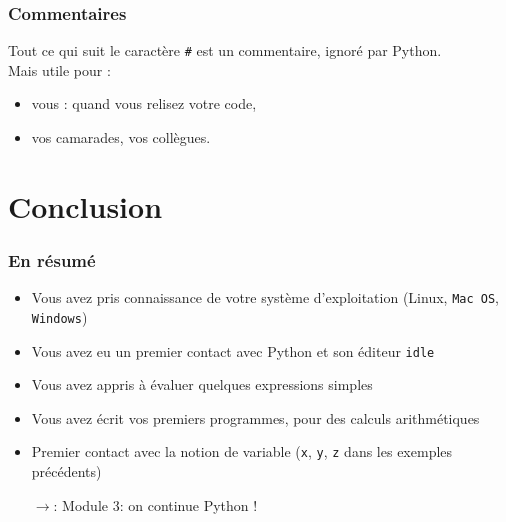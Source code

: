 \documentclass{beamer}
\newcommand{\mypause}{\pause}
\newcommand{\pyth}{{\sc Python}}
\newcommand{\prog}[1]{\alert{\texttt{#1}}}
\begin{document}
\frame
{
\frametitle{Commentaires}
{
Tout ce qui suit le caractère \prog{\#} est un commentaire, ignoré par \pyth{}.\\
Mais utile pour :
\begin{itemize}
  \item vous : quand vous relisez votre code,
  \item vos camarades, vos collègues.
\end{itemize}

}
}



\section{Conclusion}
\frame
{
\frametitle{En résumé}
\begin{itemize}
\item Vous avez pris connaissance de votre système d'exploitation (\alert{Linux},
\prog{Mac OS}, \prog{Windows})\mypause{}
\item Vous avez eu un premier contact avec \alert{\pyth{}} et son éditeur \alert{\texttt{idle}}\mypause{}
\item Vous avez appris à évaluer quelques \alert{expressions simples}\mypause{}
\item Vous avez écrit vos premiers programmes, pour des calculs arithmétiques\mypause{}
\item Premier contact avec la notion de variable (\prog{x}, \prog{y}, \prog{z} dans les exemples précédents)

\item[$\rightarrow$:] Module 3: on continue \pyth{} !
\end{itemize}
}
\end{document}
